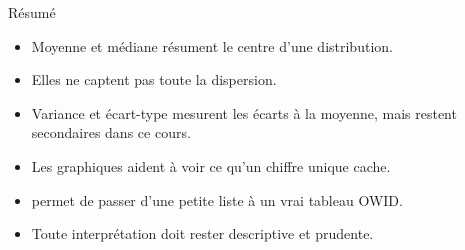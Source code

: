 \documentclass[10pt,aspectratio=169]{beamer}
\begin{document}
\begin{frame}{Résumé}
\begin{itemize}
  \item Moyenne et médiane résument le centre d'une distribution.
  \item Elles ne captent pas toute la dispersion.
  \item Variance et écart-type mesurent les écarts à la moyenne, mais restent secondaires dans ce cours.
  \item Les graphiques aident à voir ce qu'un chiffre unique cache.
  \item {} permet de passer d'une petite liste à un vrai tableau OWID.
  \item Toute interprétation doit rester descriptive et prudente.
\end{itemize}
\end{frame}
\end{document}
